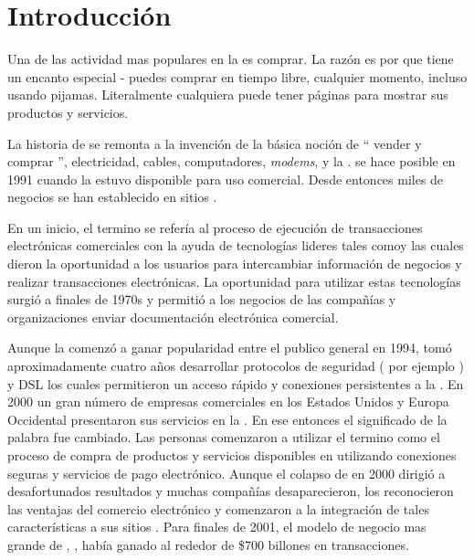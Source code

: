 \chapter{Introducción}\label{cap:intro}


Una de las actividad mas populares en la \web es comprar. La razón es por que tiene un encanto especial - puedes comprar en tiempo libre, cualquier momento, incluso usando pijamas. Literalmente cualquiera puede tener páginas para mostrar sus productos y servicios.

La historia de \ecommerce se remonta a la invención de la básica noción de “ vender y comprar ”, electricidad, cables, computadores, \textit{modems}, y la \internet. \ecommerce se hace posible en 1991 cuando la \internet estuvo disponible para uso comercial. Desde entonces miles de negocios se han establecido en sitios \web.

En un inicio, el termino \ecommerce se refería al proceso de ejecución  de transacciones electrónicas comerciales con la ayuda de tecnologías lideres tales como\edimeaning y \eftmeaning las cuales dieron la oportunidad a los usuarios para intercambiar información de negocios y realizar transacciones electrónicas. La oportunidad para utilizar estas tecnologías surgió a finales de 1970s y permitió a los negocios de las compañías y organizaciones enviar documentación electrónica comercial.

Aunque la \internet comenzó a ganar popularidad  entre el publico general en 1994, tomó aproximadamente cuatro años desarrollar protocolos de seguridad ( por ejemplo \http) y DSL los cuales permitieron un acceso rápido y conexiones persistentes a la \internet. En 2000 un gran número de empresas comerciales en los Estados Unidos y Europa Occidental presentaron sus servicios en la \www. En ese entonces el significado de la palabra \ecommerce fue cambiado. Las personas comenzaron a utilizar el termino \ecommerce como el proceso de compra de productos y servicios disponibles en \internet utilizando conexiones seguras y servicios de pago electrónico. Aunque el colapso de \dotcom en 2000 dirigió a desafortunados resultados y muchas compañías \ecommerce desaparecieron, los \retailers \brickandmortar reconocieron las ventajas del comercio electrónico y comenzaron a la integración de tales características a sus sitios \web. Para finales de 2001, el modelo de negocio mas grande de \ecommerce, \btob, había ganado al rededor de \$700 billones en transacciones.

